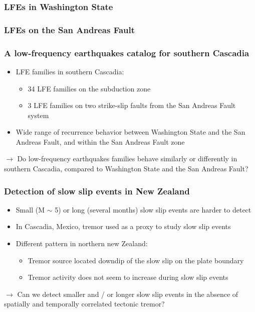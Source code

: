 \documentclass{beamer}
\begin{document}
	\begin{frame}
		\frametitle{LFEs in Washington State}
	\end{frame}

	\begin{frame}
		\frametitle{LFEs on the San Andreas Fault}
	\end{frame}

	\begin{frame}
		\frametitle{A low-frequency earthquakes catalog for southern Cascadia}
		\begin{itemize}
			\item LFE families in southern Cascadia:
			\begin{itemize}
				\item 34 LFE families on the subduction zone
				\item 3 LFE families on two strike-slip faults from the San Andreas Fault system
			\end{itemize}
			\item Wide range of recurrence behavior between Washington State and the San Andreas Fault, and within the San Andreas Fault zone
		\end{itemize}
		
		\begin{block}{}
			$\rightarrow$ Do low-frequency earthquakes families behave similarly or differently in southern Cascadia, compared to Washington State and the San Andreas Fault?
		\end{block}
	\end{frame}

	\begin{frame}
		\frametitle{Detection of slow slip events in New Zealand}
		\begin{itemize}
			\item Small (M $\sim$ 5) or long (several months) slow slip events are harder to detect
			\item In Cascadia, Mexico, tremor used as a proxy to study slow slip events
			\item Different pattern in northern new Zealand:
			\begin{itemize}
				\item Tremor source located downdip of the slow slip on the plate boundary
				\item Tremor activity does not seem to increase during slow slip events
			\end{itemize}
		\end{itemize}

		\begin{block}{}
			$\rightarrow$ Can we detect smaller and / or longer slow slip events in the absence of spatially and temporally correlated tectonic tremor?
		\end{block}			
	\end{frame}
\end{document}
